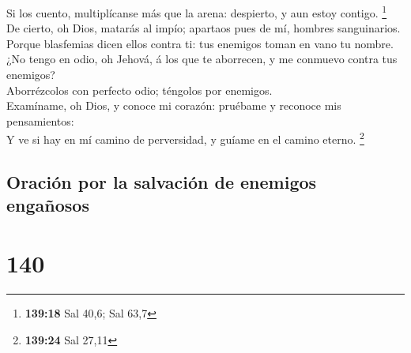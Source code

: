  Si los cuento, multiplícanse más que la arena:
despierto, y aun estoy contigo. \footnote{\textbf{139:18} Sal 40,6; Sal
  63,7}\\
 De cierto, oh Dios, matarás al impío; apartaos pues de
mí, hombres sanguinarios.\\
 Porque blasfemias dicen ellos contra ti: tus enemigos
toman en vano tu nombre.\\
 ¿No tengo en odio, oh Jehová, á los que te aborrecen, y
me conmuevo contra tus enemigos?\\
 Aborrézcolos con perfecto odio; téngolos por enemigos.\\
 Examíname, oh Dios, y conoce mi corazón: pruébame y
reconoce mis pensamientos:\\
 Y ve si hay en mí camino de perversidad, y guíame en el
camino eterno. \footnote{\textbf{139:24} Sal 27,11}

\hypertarget{oraciuxf3n-por-la-salvaciuxf3n-de-enemigos-engauxf1osos}{%
\subsection{Oración por la salvación de enemigos
engañosos}\label{oraciuxf3n-por-la-salvaciuxf3n-de-enemigos-engauxf1osos}}

\hypertarget{section-139}{%
\section{140}\label{section-139}}

